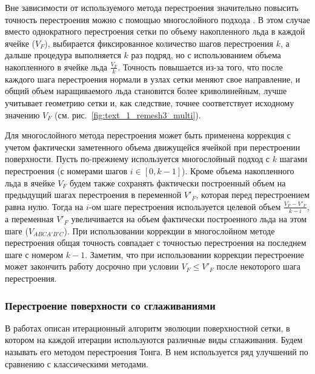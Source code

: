 Вне зависимости от используемого метода перестроения значительно повысить точность перестроения можно с помощью многослойного подхода \cite{BourgaultCote2017}.
В этом случае вместо однократного перестроения сетки по объему накопленного льда в каждой ячейке ($V_F$), выбирается фиксированное количество шагов перестроения $k$, а дальше процедура выполняется $k$ раз подряд, но с использованием объема накопленного в ячейке льда $\frac{V_F}{k}$.
Точность повышается из-за того, что после каждого шага перестроения нормали в узлах сетки меняют свое направление, и общий объем наращиваемого льда становится более криволинейным, лучше учитывает геометрию сетки и, как следствие, точнее соответствует исходному значению $V_F$ (см. рис.~\ref{fig:text_1_remesh3_multi}).

Для многослойного метода перестроения может быть применена коррекция с учетом фактически заметенного объема движущейся ячейкой при перестроении поверхности.
Пусть по-прежнему используется многослойный подход с $k$ шагами перестроения (с номерами шагов $i \in [0, k - 1]$).
Кроме объема накопленного льда в ячейке $V_F$ будем также сохранять фактически построенный объем на предыдущий шагах перестроения в переменной $V'_F$, которая перед перестроением равна нулю.
Тогда на $i$-ом шаге перестроения используется целевой объем $\frac{V_F - V'_F}{k - i}$, а переменная $V'_F$ увеличивается на объем фактически построенного льда на этом шаге ($V_{ABCA'B'C}$).
При использовании коррекции в многослойном методе перестроения общая точность совпадает с точностью перестроения на последнем шаге с номером $k - 1$.
Заметим, что при использовании коррекции перестроение может закончить работу досрочно при условии $V_F \le V'_F$ после некоторого шага перестроения.

\subsubsection{Перестроение поверхности со сглаживаниями}\label{sec:tong_method}

В работах \cite{Thompson2013Remesh,Tong2017Remesh} описан итерационный алгоритм эволюции поверхностной сетки, в котором на каждой итерации используются различные виды сглаживания.
Будем называть его методом перестроения Тонга.
В нем используется ряд улучшений по сравнению с классическими методами.


